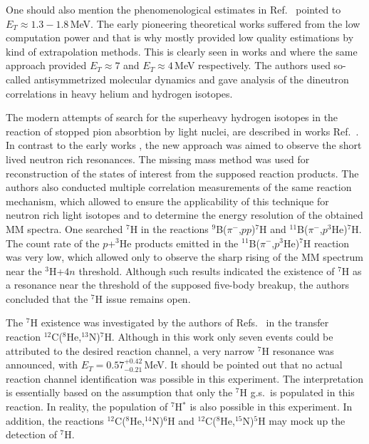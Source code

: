 One should also mention the phenomenological estimates in Ref.\ \cite{Golovkov:2004} pointed to $E_{T} \approx 1.3-1.8$\,MeV.
The early pioneering theoretical works suffered from the low computation power and that is why mostly provided low quality estimations by kind of extrapolation methods.
This is clearly seen in works \cite{Aoyama:2004} and \cite{Aoyama:2009} where the same approach provided $E_{T} \approx 7$ and $E_{T} \approx 4$\,MeV respectively.
The authors used so-called antisymmetrized molecular dynamics and gave analysis of the dineutron correlations in heavy helium and hydrogen isotopes.

The modern attempts of search for the superheavy hydrogen isotopes in the reaction of stopped pion absorbtion by light nuclei, are described in works Ref.\ \cite{Gurov:2007,Gurov:2009}.
In contrast to the early works \cite{Seth:1981,Evseev:1981}, the new approach was aimed to observe the short lived neutron rich resonances.
The missing mass method was used for reconstruction of the states of interest from the supposed reaction products.
The authors also conducted multiple correlation measurements of the same reaction mechanism, which allowed to ensure the applicability of this technique for neutron rich light isotopes and to determine the energy resolution of the obtained MM spectra.
One searched $^7$H in the reactions $^{9}$B($\pi^-$,$p$$p$)$^7$H and $^{11}$B($\pi^-$,$p^3$He)$^7$H.
The count rate of the $p$+$^3$He products emitted in the $^{11}$B($\pi^-$,$p^3$He)$^7$H reaction was very low, which allowed only to observe the sharp rising of the MM spectrum near the $^3$H+$4n$ threshold.
Although such results indicated the existence of $^7$H as a resonance near the threshold of the supposed five-body breakup, the authors concluded that the $^{7}$H issue remains open.


\newpage

The $^{7}$H existence was investigated by the authors of Refs.\ \cite{Caamano:2007,Caamano:2008} in the transfer reaction $^{12}$C($^{8}$He,$^{13}$N)$^{7}$H.
Although in this work only seven events could be attributed to the desired reaction channel, a very narrow $^7$H resonance was announced, with $E_T= 0.57^{+0.42}_{-0.21}$\,MeV.
It should be pointed out that no actual reaction channel identification was possible in this experiment.
The interpretation is essentially based on the assumption that only the $^{7}$H g.s.\ is populated in this reaction.
In reality, the population of $^{7}$H$^*$ is also possible in this experiment.
In addition, the reactions $^{12}$C($^{8}$He,$^{14}$N)$^{6}$H and $^{12}$C($^{8}$He,$^{15}$N)$^{5}$H may mock up the detection of $^{7}$H.

